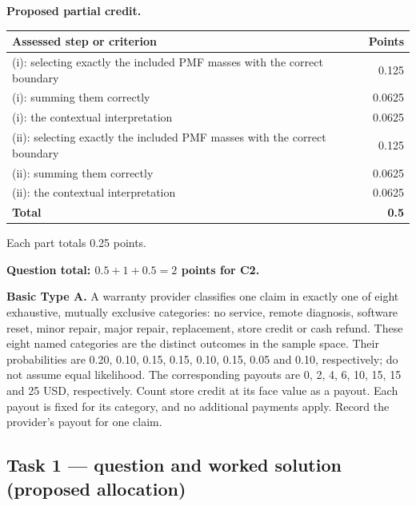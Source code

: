 \par\smallskip
\noindent\begin{minipage}{\linewidth}
\textbf{Proposed partial credit.}\par\smallskip
\begin{tabularx}{\linewidth}{@{}>{\raggedright\arraybackslash}X r@{}}\toprule
\textbf{Assessed step or criterion} & \textbf{Points}\\\midrule
(i): selecting exactly the included PMF masses with the correct boundary & 0.125\\
(i): summing them correctly & 0.0625\\
(i): the contextual interpretation & 0.0625\\
(ii): selecting exactly the included PMF masses with the correct boundary & 0.125\\
(ii): summing them correctly & 0.0625\\
(ii): the contextual interpretation & 0.0625\\
\midrule
\textbf{Total} & \textbf{0.5}\\
\bottomrule\end{tabularx}
\end{minipage}\par\smallskip

Each part totals 0.25 points.

\par\vspace{3mm}\secInicio[][sec:q3]

\textbf{Question total: $0.5+1+0.5=2$ points for C2.}

\clearpage
{}

\textbf{Basic Type A.} A warranty provider classifies one claim in exactly one of eight exhaustive, mutually exclusive categories: no service, remote diagnosis, software reset, minor repair, major repair, replacement, store credit or cash refund. These eight named categories are the distinct outcomes in the sample space. Their probabilities are 0.20, 0.10, 0.15, 0.15, 0.10, 0.15, 0.05 and 0.10, respectively; do not assume equal likelihood. The corresponding payouts are 0, 2, 4, 6, 10, 15, 15 and 25 USD, respectively. Count store credit at its face value as a payout. Each payout is fixed for its category, and no additional payments apply. Record the provider's payout for one claim.

\subsection*{Task 1 --- question and worked solution (proposed allocation) }
\label{sol:q4t1}

